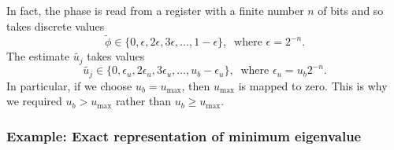 \documentclass[superscriptaddress,nofootinbib,longbibliography,aps,pre]{revtex4-1}
\newcommand{\umax}{u_{\text{max}}}
\newcommand{\aphi}{\tilde{\phi}}
\begin{document}
In fact, the phase is read from a register with a finite number $n$ of bits and so
takes discrete values
%
\begin{equation}
  \label{phaseregvals}
  \aphi \in \{0, \epsilon, 2\epsilon, 3\epsilon, \ldots, 1 - \epsilon\}, \ \text{ where } \epsilon = 2^{-n}.
\end{equation}
%
The estimate $\tilde{u_{j}}$ takes values
%
\begin{equation}
  \label{eigvaldiscrete}
  \tilde{u_{j}} \in \{0, \epsilon_{u}, 2\epsilon_{u}, 3\epsilon_{u}, \ldots, u_{b} - \epsilon_{u}\},
  \ \text{ where } \epsilon_{u} = u_{b}2^{-n}.
\end{equation}
%
In particular, if we choose $u_{b}=\umax$, then $\umax$ is mapped to zero.
This is why we required $u_{b} > \umax$  rather than $u_{b} \ge \umax$.


\subsubsection{Example: Exact representation of minimum eigenvalue}
\end{document}
